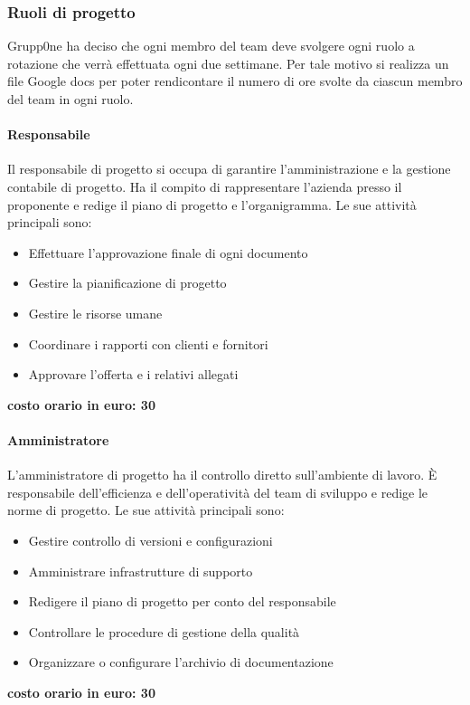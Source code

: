 \documentclass[../norme-di-progetto.tex]{subfiles}
\begin{document}
\subsubsection{Ruoli di progetto}
\label{subs:ruoli di progetto}
Grupp0ne ha deciso che ogni membro del team deve svolgere ogni ruolo a rotazione che verrà effettuata ogni due settimane. Per tale motivo si realizza un file Google docs per poter rendicontare il numero di ore svolte da ciascun membro del team in ogni ruolo.
\paragraph{Responsabile}
\label{par:responsabile}
 Il responsabile di progetto si occupa di garantire l'amministrazione e la gestione contabile di progetto. Ha il compito di rappresentare l'azienda presso il proponente e redige il piano di progetto e l'organigramma. Le sue attività principali sono:
\begin{itemize}
	\item Effettuare l'approvazione finale di ogni documento
	\item Gestire la pianificazione di progetto
	\item Gestire le risorse umane
	\item Coordinare i rapporti con clienti e fornitori
	\item Approvare l'offerta e i relativi allegati
\end{itemize}
\textbf{costo orario in euro: 30}
\paragraph{Amministratore}
\label{par:amministratore}
L'amministratore di progetto ha il controllo diretto sull'ambiente di lavoro. È responsabile dell'efficienza e dell'operatività del team di sviluppo e redige le norme di progetto. Le sue attività principali sono:
\begin{itemize}
	\item Gestire controllo di versioni e configurazioni
	\item Amministrare infrastrutture di supporto
	\item Redigere il piano di progetto per conto del responsabile
	\item Controllare le procedure di gestione della qualità
	\item Organizzare o configurare l'archivio di documentazione
\end{itemize}
\textbf{costo orario in euro: 30}
\end{document}
